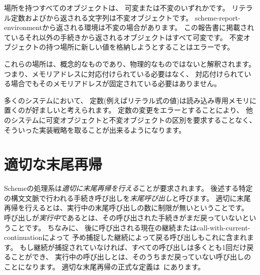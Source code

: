 場所を持つすべてのオブジェクトは、
可変または不変のいずれかです。
リテラル定数およびから返される文字列は不変オブジェクトです。
{\cf scheme-report-environment}から返される環境は不変の場合があります。
この報告書に掲載されているそれ以外の手続きから返されるオブジェクトはすべて可変です。
不変オブジェクトの持つ場所に新しい値を格納しようとすることはエラーです。


これらの場所は、概念的なものであり、物理的なものではないと解釈されます。
つまり、メモリアドレスに対応付けられている必要はなく、
対応付けられている場合でもそのメモリアドレスが固定されている必要はありません。

\begin{rationale}
多くのシステムにおいて、
定数(例えばリテラル式の値)は読み込み専用メモリに置くのが好ましいと考えられます。
定数の変更をエラーとすることにより、
他のシステムに可変オブジェクトと不変オブジェクトの区別を要求することなく、
そういった実装戦略を取ることが出来るようになります。
\end{rationale}

\section{適切な末尾再帰}
\label{proper tail recursion}

Schemeの処理系は{\em 適切に末尾再帰を行える}ことが要求されます。
後述する特定の構文文脈で行われる手続き呼び出しを{\em 末尾呼び出し}と呼びます。
適切に末尾再帰を行えるとは、実行中の末尾呼び出しの数に制限が無いということです。
呼び出しが{\em 実行中}であるとは、その呼び出された手続きがまだ戻っていないということです。
ちなみに、
後に呼び出される現在の継続または{\cf call-with-current-continuation}によって
予め捕捉した継続によって戻る呼び出しもこれに含まれます。
もし継続が捕捉されていなければ、すべての呼び出しは多くとも1回だけ戻ることができ、
実行中の呼び出しとは、そのうちまだ戻っていない呼び出しのことになります。
適切な末尾再帰の正式な定義は\cite{propertailrecursion}~にあります。

